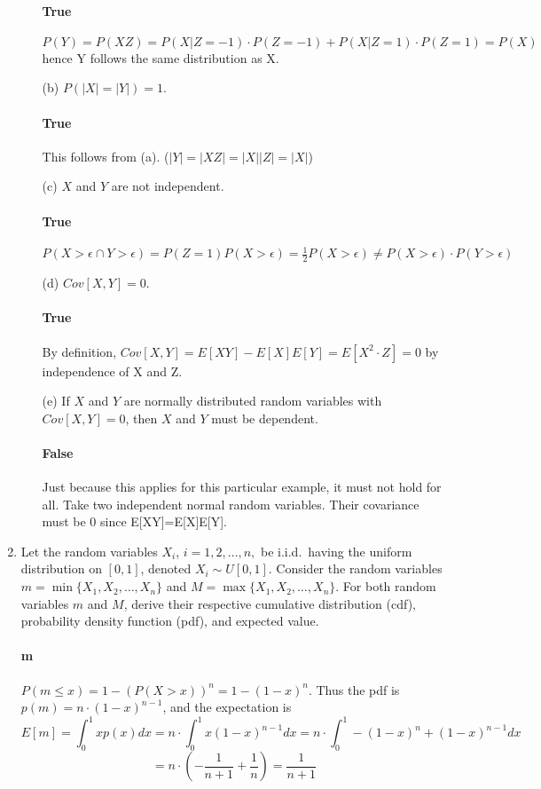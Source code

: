 \documentclass[letterpaper,12pt]{article}
\theoremstyle{definition}
\begin{document}
\begin{enumerate}
\begin{itemize}
            \paragraph{True} $P(Y) = P(XZ) = P(X\vert Z = -1)\cdot P(Z = -1) + P(X\vert Z = 1)\cdot P(Z = 1) = P(X)$ hence Y follows the same distribution as X.
			\item[(b)] $P(|X|=|Y|)=1$.
            \paragraph{True} This follows from (a). ($|Y| = |XZ| =|X||Z| = |X| $)
			\item[(c)] $X$ and $Y$ are not independent.
            \paragraph{True} $P(X>\epsilon \cap Y>\epsilon) = P(Z = 1)P(X>\epsilon) = \frac{1}{2} P(X>\epsilon) \neq P(X>\epsilon)\cdot P(Y>\epsilon) $
            
			\item[(d)] $Cov[X,Y]=0$.
            \paragraph{True} By definition,   $Cov[X,Y]= E[XY] - E[X]E[Y] = E[X^2 \cdot Z] = 0$ by independence of X and Z.
            
			\item[(e)] If $X$ and $Y$ are normally distributed random variables with $Cov[X,Y]=0$, then $X$ and $Y$ 					must be dependent.
        \paragraph{False} Just because this applies for this particular example, it must not hold for all. Take two independent normal random variables. Their covariance must be 0 since E[XY]=E[X]E[Y].       
		\end{itemize}

	\item Let the random variables $X_i$, $i=1,2,\ldots,n,$ be i.i.d.\ having the uniform distribution on $[0,1]$, denoted $X_i \sim U[0,1]$. Consider the random variables $m=\min\{X_1,X_2,\ldots,X_n\}$ and $M=\max\{X_1,X_2,\ldots,X_n\}$. For both random variables $m$ and $M$, derive their respective cumulative distribution (cdf), probability density function (pdf), and expected value.
    \paragraph{m} $P( m \le x) = 1 - (P(X > x))^n= 1 - (1 - x)^n$.
    Thus the pdf is $p(m) = n\cdot (1 - x)^{n - 1}$, and the expectation is
    $$E[m] = \int_0^1 x p(x) dx = n \cdot \int_0^1 x (1 - x)^{n - 1} dx = n \cdot \int_0^1 - (1 - x)^{n} + (1 - x)^{n - 1} dx $$
    $$ = n \cdot ( - \frac{1}{n + 1} + \frac{1}{n}) = \frac{1}{n + 1} $$
    

\end{enumerate}
\end{document}
